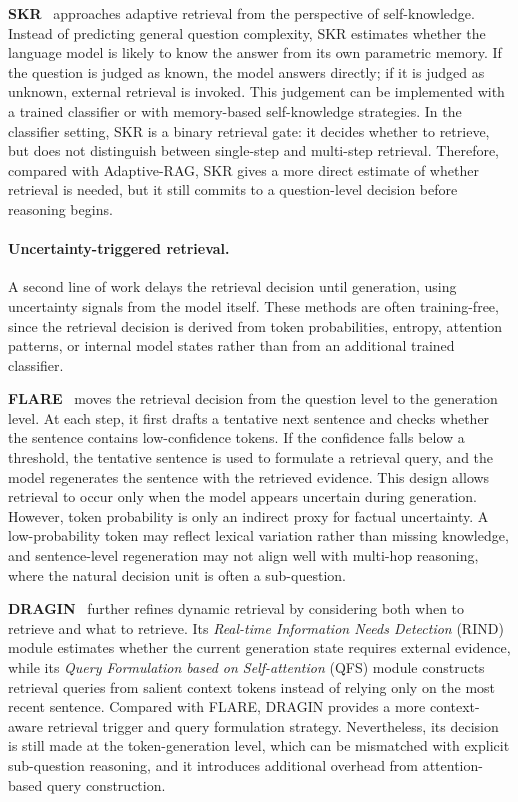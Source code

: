 \documentclass{nthu_thesis}
\begin{document}
\begin{thesiscjk}
\textbf{SKR}~\cite{skr} approaches adaptive retrieval from the perspective of self-knowledge. Instead of predicting general question complexity, SKR estimates whether the language model is likely to know the answer from its own parametric memory. If the question is judged as known, the model answers directly; if it is judged as unknown, external retrieval is invoked. This judgement can be implemented with a trained classifier or with memory-based self-knowledge strategies. In the classifier setting, SKR is a binary retrieval gate: it decides whether to retrieve, but does not distinguish between single-step and multi-step retrieval. Therefore, compared with Adaptive-RAG, SKR gives a more direct estimate of whether retrieval is needed, but it still commits to a question-level decision before reasoning begins.


\paragraph{Uncertainty-triggered retrieval.}

A second line of work delays the retrieval decision until generation, using uncertainty signals from the model itself. These methods are often training-free, since the retrieval decision is derived from token probabilities, entropy, \mbox{attention} patterns, or internal model states rather than from an additional trained classifier.

\textbf{FLARE}~\cite{flare} moves the retrieval decision from the question level to the generation level. At each step, it first drafts a tentative next sentence and checks whether the sentence contains low-confidence tokens. If the confidence falls below a threshold, the tentative sentence is used to formulate a retrieval query, and the model regenerates the sentence with the retrieved evidence. This design allows retrieval to occur only when the model appears uncertain during generation. However, token probability is only an indirect proxy for factual uncertainty. A low-probability token may reflect lexical variation rather than missing knowledge, and sentence-level regeneration may not align well with multi-hop reasoning, where the natural decision unit is often a sub-question.

\textbf{DRAGIN}~\cite{dragin} further refines dynamic retrieval by considering both when to retrieve and what to retrieve. Its \emph{Real-time Information Needs Detection} (RIND) module estimates whether the current generation state requires external evidence, while its \emph{Query \mbox{Formulation} based on Self-attention} (QFS) module constructs retrieval queries from salient \mbox{context} tokens instead of relying only on the most recent sentence. Compared with FLARE, DRAGIN provides a more context-aware retrieval trigger and query formulation strategy. Nevertheless, its decision is still made at the token-generation level, which can be mismatched with explicit sub-question reasoning, and it introduces additional overhead from attention-based query construction.


\end{thesiscjk}
\end{document}
